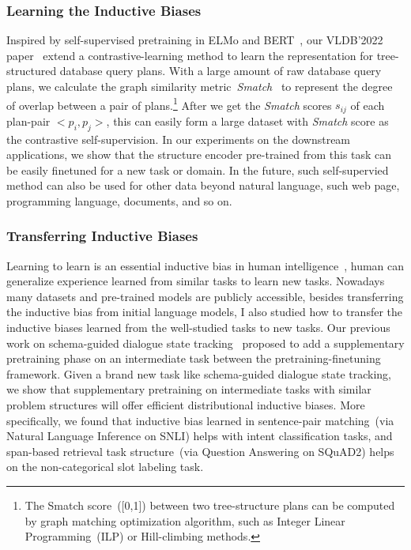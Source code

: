 \subsubsection{Learning the Inductive Biases}
\label{sssec:future:learn-biases}
Inspired by self-supervised pretraining in ELMo and
BERT~\cite{devlin2019bert}, our VLDB'2022
paper~\cite{paul2021database} extend a contrastive-learning method to
learn the representation for tree-structured database query
plans. With a large amount of raw database query plans, we calculate
the graph similarity metric~{\em Smatch}~\cite{Cai:2013wn} to
represent the degree of overlap between a pair of plans.\footnote{The
  Smatch score~([0,1]) between two tree-structure plans can be
  computed by graph matching optimization algorithm, such as Integer
  Linear Programming~(ILP) or Hill-climbing methods.}  After we get
the {\em Smatch} scores $s_{ij}$ of each plan-pair $<p_{i}, p_{j}>$,
this can easily form a large dataset with {\em Smatch} score as the
contrastive self-supervision. In our experiments on the downstream
applications, we show that the structure encoder pre-trained from this
task can be easily finetuned for a new task or domain. In the future,
such self-supervied method can also be used for other data beyond
natural language, such web page, programming language, documents, and
so on.

\subsubsection{Transferring Inductive Biases}
\label{sssec:future:transfer-biases}
Learning to learn is an essential inductive bias in human
intelligence~\cite{harlow1949formation}, human can generalize
experience learned from similar tasks to learn new tasks. Nowadays
many datasets and pre-trained models are publicly accessible, besides
transferring the inductive bias from initial language models, I also
studied how to transfer the inductive biases learned from the
well-studied tasks to new tasks. Our previous work on schema-guided
dialogue state tracking~\cite{cao2021schema} proposed to add a
supplementary pretraining phase on an intermediate task between the
pretraining-finetuning framework. Given a brand new task like
schema-guided dialogue state tracking, we show that supplementary
pretraining on intermediate tasks with similar problem structures will
offer efficient distributional inductive biases. More specifically, we
found that inductive bias learned in sentence-pair matching~(via
Natural Language Inference on SNLI) helps with intent classification
tasks, and span-based retrieval task structure~(via Question Answering
on SQuAD2) helps on the non-categorical slot labeling task.


